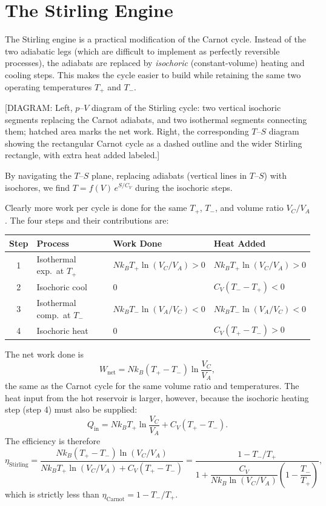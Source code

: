 \section{The Stirling Engine}

The Stirling engine is a practical modification of the Carnot cycle. Instead of the two adiabatic legs (which are difficult to implement as perfectly reversible processes), the adiabats are replaced by \emph{isochoric} (constant-volume) heating and cooling steps. This makes the cycle easier to build while retaining the same two operating temperatures $T_+$ and $T_-$.

\begin{center}[DIAGRAM: Left, $p$--$V$ diagram of the Stirling cycle: two vertical isochoric segments replacing the Carnot adiabats, and two isothermal segments connecting them; hatched area marks the net work. Right, the corresponding $T$--$S$ diagram showing the rectangular Carnot cycle as a dashed outline and the wider Stirling rectangle, with extra heat added labeled.]\end{center}

By navigating the $T$--$S$ plane, replacing adiabats (vertical lines in $T$--$S$) with isochores, we find $T = f(V)\,e^{S/C_V}$ during the isochoric steps.

Clearly more work per cycle is done for the same $T_+$, $T_-$, and volume ratio $V_C/V_A$. The four steps and their contributions are:

\begin{center}
\begin{tabular}{clll}
    \hline
    Step & Process & Work Done & Heat Added \\
    \hline
    1 & Isothermal exp.\ at $T_+$ & $Nk_BT_+\ln(V_C/V_A) > 0$ & $Nk_BT_+\ln(V_C/V_A) > 0$ \\
    2 & Isochoric cool & $0$ & $C_V(T_- - T_+) < 0$ \\
    3 & Isothermal comp.\ at $T_-$ & $Nk_BT_-\ln(V_A/V_C) < 0$ & $Nk_BT_-\ln(V_A/V_C) < 0$ \\
    4 & Isochoric heat & $0$ & $C_V(T_+ - T_-) > 0$ \\
    \hline
\end{tabular}
\end{center}

The net work done is
\begin{equation}
    W_{\text{net}} = Nk_B(T_+ - T_-)\ln\frac{V_C}{V_A},
\end{equation}
the same as the Carnot cycle for the same volume ratio and temperatures. The heat input from the hot reservoir is larger, however, because the isochoric heating step (step 4) must also be supplied:
\begin{equation}
    Q_{\text{in}} = Nk_BT_+\ln\frac{V_C}{V_A} + C_V(T_+ - T_-).
\end{equation}
The efficiency is therefore
\begin{equation}
    \eta_{\text{Stirling}} = \frac{Nk_B(T_+-T_-)\ln(V_C/V_A)}{Nk_BT_+\ln(V_C/V_A) + C_V(T_+-T_-)}
    = \frac{1 - T_-/T_+}{1 + \dfrac{C_V}{Nk_B\ln(V_C/V_A)}\left(1 - \dfrac{T_-}{T_+}\right)},
\end{equation}
which is strictly less than $\eta_{\text{Carnot}} = 1 - T_-/T_+$.

